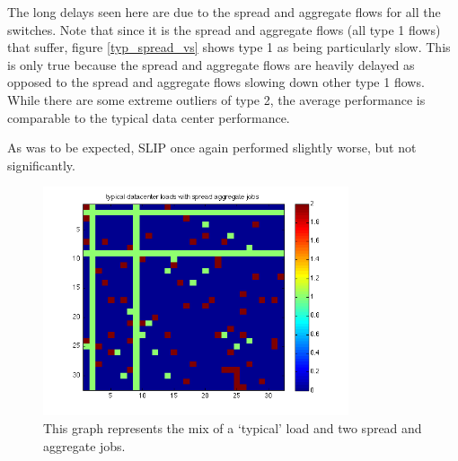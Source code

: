 \documentclass[11pt]{article}%
\begin{document}
The long delays seen here are due to the spread and aggregate flows for all the switches.  Note that since it is the spread and aggregate flows (all type 1 flows) that suffer, figure \ref{typ_spread_vs} shows type 1 as being particularly slow.  This is only true because the spread and aggregate flows are heavily delayed as opposed to the spread and aggregate flows slowing down other type 1 flows.  While there are some extreme outliers of type 2, the average performance is comparable to the typical data center performance.

As was to be expected, SLIP once again performed slightly worse, but not significantly.
\begin{figure}%
	 \includegraphics[width=90mm]{typ_spread_flows.png}
	\caption{This graph represents the mix of a `typical' load and two spread and aggregate jobs.}
	\label{typ_spread_flows}
\end{figure}

%
\end{document}
